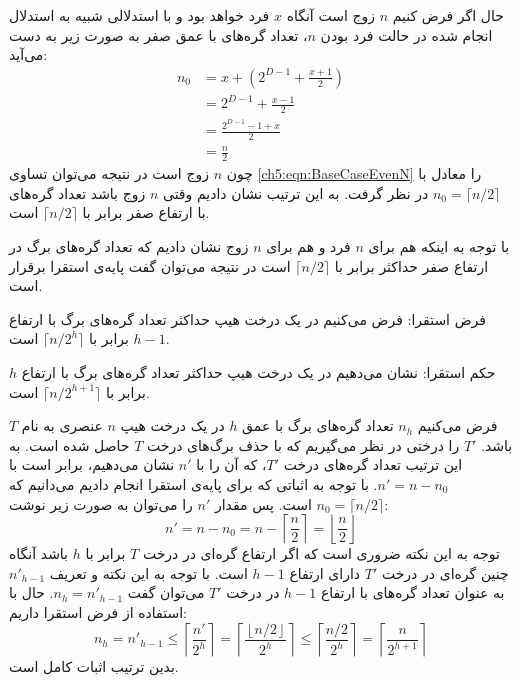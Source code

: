 حال اگر فرض کنیم {$n$} زوج است آنگاه {$x$} فرد خواهد بود و با استدلالی شبیه به استدلال انجام شده در حالت فرد بودن {$n$}، تعداد گره‌های با عمق صفر به صورت زیر به دست می‌آید:
\begin{align}
n_0 &= x+\left( 2^{D-1} + \frac{x+1}{2}\right)\nonumber\\
&=2^{D-1}+\frac{x-1}{2}\nonumber\\
&=\frac{2^{D-1}-1+x}{2}\nonumber\\
&=\frac{n}{2}\label{ch5:eqn:BaseCaseEvenN}
\end{align}
چون {$n$} زوج است در نتیجه می‌توان تساوی {\eqref{ch5:eqn:BaseCaseEvenN}} را معادل با {$n_0=\lceil n/2\rceil$} در نظر گرفت. به این ترتیب نشان دادیم وقتی {$n$} زوج باشد تعداد گره‌های با ارتفاع صفر برابر با {$\lceil n/2\rceil$} است.

با توجه به اینکه هم برای {$n$} فرد و هم برای {$n$} زوج نشان دادیم که تعداد گره‌های برگ در ارتفاع صفر حداکثر برابر با {$\lceil n/2\rceil$} است در نتیجه می‌توان گفت پایه‌ی استقرا برقرار است.

فرض استقرا: فرض می‌کنیم در یک درخت هیپ حداکثر تعداد گره‌های برگ با ارتفاع {$h-1$} برابر با {$\lceil n/2^{h}\rceil$} است.

حکم استقرا: نشان می‌دهیم در یک درخت هیپ حداکثر تعداد گره‌های برگ با ارتفاع {$h$} برابر با {$\lceil n/2^{h+1}\rceil$} است.

فرض می‌کنیم {$n_h$} تعداد گره‌های برگ با عمق {$h$} در یک درخت هیپ {$n$} عنصری به نام {$T$} باشد. {$T'$} را درختی در نظر می‌گیریم که با حذف برگ‌های درخت {$T$} حاصل شده است. به این ترتیب تعداد گره‌های درخت {$T'$}، که آن را با {$n'$} نشان می‌دهیم، برابر است با {$n'=n-n_0$}. با توجه به اثباتی که برای پایه‌ی استقرا انجام دادیم می‌دانیم که {$n_0=\lceil n/2 \rceil$} است. پس مقدار {$n'$} را می‌توان به صورت زیر نوشت:
\begin{displaymath}
n' = n - n_0=n-\left\lceil \frac{n}{2}\right\rceil =\left\lfloor \frac{n}{2}\right\rfloor
\end{displaymath}
توجه به این نکته ضروری است که اگر ارتفاع گره‌ای در درخت {$T$} برابر با {$h$} باشد آنگاه چنین گره‌ای در درخت {$T'$} دارای ارتفاع {$h-1$} است. با توجه به این نکته و تعریف {${n'}_{h-1}$} به ‌عنوان تعداد گره‌های با ارتفاع {$h-1$} در درخت {$T'$} می‌توان گفت {$n_h=n'_{h-1}$}. حال با استفاده از فرض استقرا داریم:
\begin{displaymath}
n_h=n'_{h-1} \leq \left\lceil \frac{n'}{2^h}\right\rceil=\left\lceil \frac{\left\lfloor n/2 \right\rfloor}{2^h}\right\rceil \leq \left\lceil \frac{n/2}{2^h}\right\rceil=\left\lceil \frac{n}{2^{h+1}} \right\rceil
\end{displaymath}
بدین ترتیب اثبات کامل است.